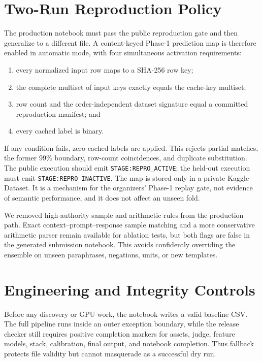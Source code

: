 \documentclass[11pt]{article}
\begin{document}
\section{Two-Run Reproduction Policy}

The production notebook must pass the public reproduction gate and then generalize
to a different file. A content-keyed Phase-1 prediction map is therefore enabled in
automatic mode, with four simultaneous activation requirements:

\begin{enumerate}
  \item every normalized input row maps to a SHA-256 row key;
  \item the complete multiset of input keys exactly equals the cache-key multiset;
  \item row count and the order-independent dataset signature equal a committed
        reproduction manifest; and
  \item every cached label is binary.
\end{enumerate}

If any condition fails, zero cached labels are applied. This rejects partial matches,
the former 99\% boundary, row-count coincidences, and duplicate substitution. The
public execution should emit \texttt{STAGE:REPRO\_ACTIVE}; the held-out execution
must emit \texttt{STAGE:REPRO\_INACTIVE}. The map is stored only in a private Kaggle
Dataset. It is a mechanism for the organizers' Phase-1 replay gate, not evidence of
semantic performance, and it does not affect an unseen fold.

We removed high-authority sample and arithmetic rules from the production path.
Exact context--prompt--response sample matching and a more conservative arithmetic
parser remain available for ablation tests, but both flags are false in the generated
submission notebook. This avoids confidently overriding the ensemble on unseen
paraphrases, negations, units, or new templates.

\section{Engineering and Integrity Controls}

Before any discovery or GPU work, the notebook writes a valid baseline CSV. The full
pipeline runs inside an outer exception boundary, while the release checker still
requires positive completion markers for assets, judge, feature models, stack,
calibration, final output, and notebook completion. Thus fallback protects file
validity but cannot masquerade as a successful dry run.
\end{document}
